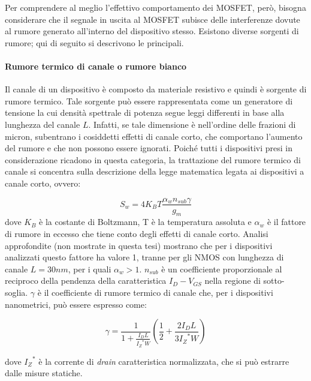 \vspace*{0.5cm}

Per comprendere al meglio l'effettivo comportamento dei MOSFET, però, bisogna considerare che il segnale in uscita al MOSFET subisce delle interferenze dovute al rumore generato all'interno del dispositivo stesso. Esistono diverse sorgenti di rumore; qui di seguito si descrivono le principali.

\paragraph*{Rumore termico di canale o rumore bianco}
Il canale di un dispositivo è composto da materiale resistivo e quindi è sorgente di rumore termico. Tale sorgente può essere rappresentata come un generatore di tensione la cui densità spettrale di potenza segue leggi differenti in base alla lunghezza del canale $L$.  Infatti, se tale dimensione è nell'ordine delle frazioni di micron, subentrano i cosiddetti effetti di canale corto, che comportano l'aumento del rumore e che non possono essere ignorati.
Poiché tutti i dispositivi presi in considerazione ricadono in questa categoria, la trattazione del rumore termico di canale si concentra sulla descrizione della legge matematica legata ai dispositivi a canale corto, ovvero:

\begin{equation}
  S_w = 4 K_B T \frac{\alpha_w n_{sub} \gamma}{g_m}
\end{equation}
dove $K_B$ è la costante di Boltzmann, T è la temperatura assoluta e $\alpha_w$ è il fattore di rumore in eccesso che tiene conto degli effetti di canale corto. Analisi approfondite (non mostrate in questa tesi) mostrano che per i dispositivi analizzati questo fattore ha valore 1, tranne per gli NMOS con lunghezza di canale $L = 30nm$, per i quali $\alpha_w > 1$. $n_{sub}$ è un coefficiente proporzionale al reciproco della pendenza della caratteristica $I_D-V_{GS}$ nella regione di sotto-soglia. $\gamma$ è il coefficiente di rumore termico di canale che, per i dispositivi nanometrici, può essere espresso come:

\begin{equation}
  \gamma = \frac{1}{1 +  \frac {I_D L}{{I_Z}^* W}}\left(\frac{1}{2} + \frac{ 2 I_D L}{3 {I_Z}^* W}\right)
\end{equation}

dove ${I_Z}^*$ è la corrente di \emph{drain} caratteristica normalizzata, che si può estrarre dalle misure statiche.

